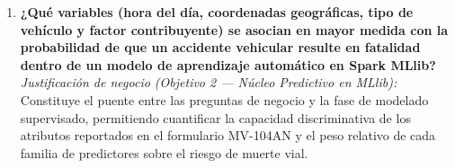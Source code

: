\begin{enumerate}
    \item \textbf{¿Qué variables (hora del día, coordenadas geográficas, tipo de vehículo y factor contribuyente) se asocian en mayor medida con la probabilidad de que un accidente vehicular resulte en fatalidad dentro de un modelo de aprendizaje automático en Spark MLlib?}\\
    \textit{Justificación de negocio (Objetivo 2 --- Núcleo Predictivo en MLlib):} Constituye el puente entre las preguntas de negocio y la fase de modelado supervisado, permitiendo cuantificar la capacidad discriminativa de los atributos reportados en el formulario MV-104AN y el peso relativo de cada familia de predictores sobre el riesgo de muerte vial.

\end{enumerate}
